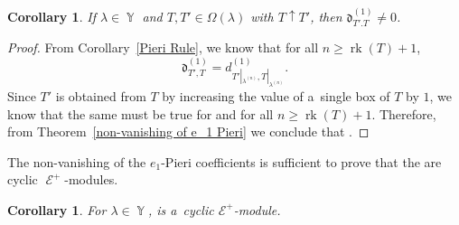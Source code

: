 \documentclass[10pt,a4paper]{amsart}
\numberwithin{equation}{section}
\newtheorem{Corollary}[Theorem]{Corollary}
\theoremstyle{definition}
\DeclareMathOperator{\Par}{\mathbb{Y}}
\DeclareMathOperator{\sE}{\mathcal{E}}
\DeclareMathOperator{\rk}{\mathrm{rk}}
\begin{document}
\begin{Corollary}\label{non-vanishing of e_1 Pieri for limit MacD}
 If $\lambda \in \Par$ and $T,T' \in \Omega(\lambda)$ with $T\uparrow T'$, then $\mathfrak{d}_{T'.T}^{(1)} \neq 0$.
\end{Corollary}

\begin{proof}
 From Corollary~\ref{Pieri Rule}, we know that for all $n \geq \rk(T)+1$,
 \[
 \mathfrak{d}_{T',T}^{(1)} = d_{T'|_{\lambda^{(n)}},T|_{\lambda^{(n)}}}^{(1)}.
 \]
 Since $T'$ is obtained from $T$ by increasing the value of a~single box of $T$ by $1$, we know that the same must be true for  and  for all $n \geq \rk(T)+1$. Therefore, from Theorem~\ref{non-vanishing of e_1 Pieri} we conclude that .
\end{proof}

The non-vanishing of the $e_1$-Pieri coefficients is sufficient to prove that the  are cyclic $\sE^{+}$-modules.

\begin{Corollary}\label{Murnaghan type modules are cyclic +EHA reps}
 For $\lambda \in \Par$,  is a~cyclic $\mathcal{E}^{+}$-module.
\end{Corollary}
\end{document}
